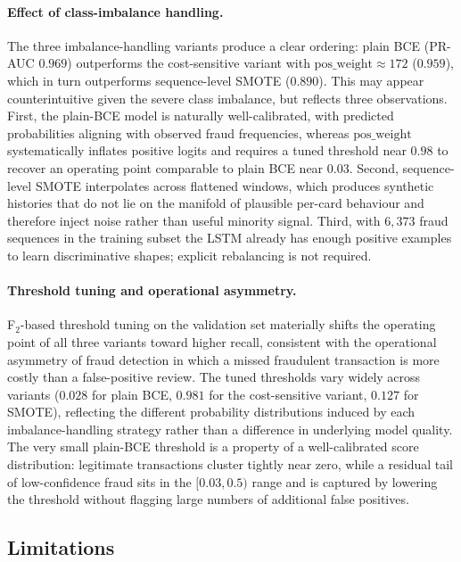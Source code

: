 \documentclass[oneside,12pt,parskip=half,american,numbers=noenddot]{scrreprt}
\begin{document}
\paragraph{Effect of class-imbalance handling.}
The three imbalance-handling variants produce a clear ordering: plain BCE (PR-AUC $0.969$) outperforms the cost-sensitive variant with $\text{pos\_weight}\approx 172$ ($0.959$), which in turn outperforms sequence-level SMOTE ($0.890$). This may appear counterintuitive given the severe class imbalance, but reflects three observations. First, the plain-BCE model is naturally well-calibrated, with predicted probabilities aligning with observed fraud frequencies, whereas $\text{pos\_weight}$ systematically inflates positive logits and requires a tuned threshold near $0.98$ to recover an operating point comparable to plain BCE near $0.03$. Second, sequence-level SMOTE interpolates across flattened windows, which produces synthetic histories that do not lie on the manifold of plausible per-card behaviour and therefore inject noise rather than useful minority signal. Third, with $6{,}373$ fraud sequences in the training subset the LSTM already has enough positive examples to learn discriminative shapes; explicit rebalancing is not required.

\paragraph{Threshold tuning and operational asymmetry.}
F$_2$-based threshold tuning on the validation set materially shifts the operating point of all three variants toward higher recall, consistent with the operational asymmetry of fraud detection in which a missed fraudulent transaction is more costly than a false-positive review. The tuned thresholds vary widely across variants ($0.028$ for plain BCE, $0.981$ for the cost-sensitive variant, $0.127$ for SMOTE), reflecting the different probability distributions induced by each imbalance-handling strategy rather than a difference in underlying model quality. The very small plain-BCE threshold is a property of a well-calibrated score distribution: legitimate transactions cluster tightly near zero, while a residual tail of low-confidence fraud sits in the $[0.03, 0.5)$ range and is captured by lowering the threshold without flagging large numbers of additional false positives.


\subsection{Limitations}
\end{document}
